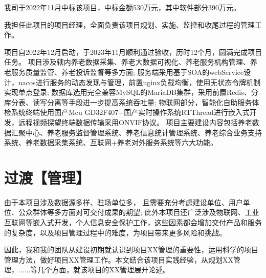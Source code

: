 \documentclass[UTF8]{../computerUniverse}
\begin{document}
我司于2022年11月中标该项目，中标金额530万元，其中软件部分390万元。

我担任此项目的项目经理，全面负责该项目规划、实施、监控和收尾过程的管理工作。

项目自2022年12月启动，于2023年11月顺利通过验收，历时12个月，圆满完成项目任务。
项目涉及辖内养老数据采集、养老大数据可视化、养老服务机构管理、养老服务质量监管、养老投诉监督等多方面;
服务端采用基于SOA的webService设计，nacos进行服务的动态发现与管理，前置nginx负载均衡，使用无状态令牌机制实现单点登录;
数据库选用完全兼容MySQL的MariaDB集群，采用前置Redis、分库分表、读写分离等手段进一步提高系统吞吐量;
物联网部分，智能化自助服务体检系统终端使用国产Mcu GD32F407+国产实时操作系统RTThread进行嵌入式开发，远程视频探望终端数据传输采用ONVIF协议。
项目主要建设内容包括养老数据汇聚中心、养老服务监督管理系统、养老信息统计管理系统、养老综合业务支持系统、养老数据采集系统、互联网+养老对外服务系统等六大功能。







\section{过渡【管理】}


由于本项目涉及数据源多样、驻场单位多，
且需要充分考虑建设单位、用户单位、公众群体等多方面对可交付成果的期望;
此外本项目还广泛涉及物联网、工业互联网等嵌入式开发，个人信息安全保护工作，这些因素都会增加交付产品和服务的复杂度，以及项目管理过程中的难度，为项目带来更多风险和挑战。

因此，我和我的团队从建设初期就认识到项目XX管理的重要性，运用科学的项目管理方法，做好项目XX管理工作。本文结合该项目实践经验，从规划XX管理，......等几个方面，就该项目的XX管理展开论述。
\end{document}
